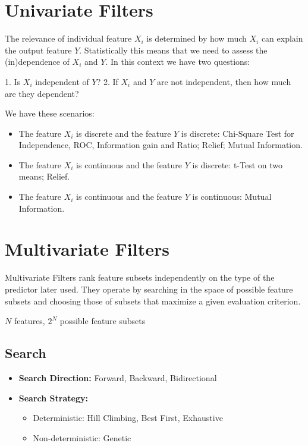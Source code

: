 \section*{Univariate Filters}

The relevance of individual feature $X_i$ is determined by how much $X_i$ can explain the output feature $Y$. Statistically this means that we need to assess the (in)dependence of $X_i$ and $Y$. In this context we have two questions:

1. Is $X_i$ independent of $Y$?
2. If $X_i$ and $Y$ are not independent, then how much are they dependent?

We have these scenarios:
\begin{itemize}
    \item The feature $X_i$ is discrete and the feature $Y$ is discrete: Chi-Square Test for Independence, ROC, Information gain and Ratio; Relief; Mutual Information.
    \item The feature $X_i$ is continuous and the feature $Y$ is discrete: t-Test on two means; Relief.
    \item The feature $X_i$ is continuous and the feature $Y$ is continuous: Mutual Information.
\end{itemize}

\section*{Multivariate Filters}
Multivariate Filters rank feature subsets independently on the type of the predictor later used. They operate by searching in the space of possible feature subsets and choosing those of subsets that maximize a given evaluation criterion.

$N$ features, $2^N$ possible feature subsets

\subsection*{Search}
\begin{itemize}
    \item \textbf{Search Direction:} Forward, Backward, Bidirectional
    \item \textbf{Search Strategy:} 
    \begin{itemize}
        \item Deterministic: Hill Climbing, Best First, Exhaustive
        \item Non-deterministic: Genetic
    \end{itemize}
\end{itemize}

